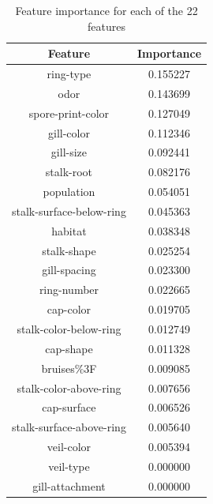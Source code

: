 \documentclass[]{article}
\begin{document}
\begin{table}[h]
    \centering
    \begin{tabular}{|c|c|} \hline 
    Feature                 &  Importance\\ \hline
    ring-type                 &  0.155227\\ \hline
    odor                      &  0.143699 \\ \hline 
    spore-print-color         &  0.127049 \\ \hline 
    gill-color                &  0.112346 \\ \hline 
    gill-size                 &  0.092441 \\ \hline 
    stalk-root                &  0.082176 \\ \hline 
    population                &  0.054051 \\ \hline 
    stalk-surface-below-ring  &  0.045363 \\ \hline 
    habitat                   &  0.038348 \\ \hline 
    stalk-shape               &  0.025254 \\ \hline 
    gill-spacing              &  0.023300 \\ \hline 
    ring-number               &  0.022665 \\ \hline 
    cap-color                 &  0.019705 \\ \hline 
    stalk-color-below-ring    &  0.012749 \\ \hline 
    cap-shape                 &  0.011328  \\ \hline 
    bruises\%3F               &   0.009085  \\ \hline 
    stalk-color-above-ring    &  0.007656 \\ \hline 
    cap-surface               &  0.006526 \\ \hline 
    stalk-surface-above-ring  &  0.005640 \\ \hline 
    veil-color                &  0.005394 \\ \hline 
    veil-type                 &  0.000000 \\ \hline 
    gill-attachment           &  0.000000   \\ \hline 

    \end{tabular}
    \caption{Feature importance for each of the 22 features}
    \label{tab:my_label}
\end{table}


\newpage
\end{document}
